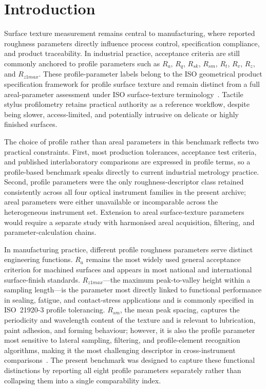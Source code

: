 \documentclass{article}
\begin{document}
\section{Introduction}\label{sec:intro}
Surface texture measurement remains central to manufacturing, where reported roughness parameters directly influence process control, specification compliance, and product traceability. In industrial practice, acceptance criteria are still commonly anchored to profile parameters such as $R_a$, $R_q$, $R_{sk}$, $R_{sm}$, $R_t$, $R_v$, $R_z$, and $R_{z1max}$. These profile-parameter labels belong to the ISO geometrical product specification framework for profile surface texture and remain distinct from a full areal-parameter assessment under ISO surface-texture terminology~\cite{ISO21920-2-2021,ISO25178-2-2021}. Tactile stylus profilometry retains practical authority as a reference workflow, despite being slower, access-limited, and potentially intrusive on delicate or highly finished surfaces.

The choice of profile rather than areal parameters in this benchmark reflects two practical constraints. First, most production tolerances, acceptance test criteria, and published interlaboratory comparisons are expressed in profile terms, so a profile-based benchmark speaks directly to current industrial metrology practice. Second, profile parameters were the only roughness-descriptor class retained consistently across all four optical instrument families in the present archive; areal parameters were either unavailable or incomparable across the heterogeneous instrument set. Extension to areal surface-texture parameters would require a separate study with harmonised areal acquisition, filtering, and parameter-calculation chains.

In manufacturing practice, different profile roughness parameters serve distinct engineering functions. $R_a$ remains the most widely used general acceptance criterion for machined surfaces and appears in most national and international surface-finish standards. $R_{z1max}$---the maximum peak-to-valley height within a sampling length---is the parameter most directly linked to functional performance in sealing, fatigue, and contact-stress applications and is commonly specified in ISO~21920-3 profile tolerancing. $R_{sm}$, the mean peak spacing, captures the periodicity and wavelength content of the texture and is relevant to lubrication, paint adhesion, and forming behaviour; however, it is also the profile parameter most sensitive to lateral sampling, filtering, and profile-element recognition algorithms, making it the most challenging descriptor in cross-instrument comparisons~\cite{ISO21920-2-2021,ISO21920-3-2021}. The present benchmark was designed to capture these functional distinctions by reporting all eight profile parameters separately rather than collapsing them into a single comparability index.
\end{document}
